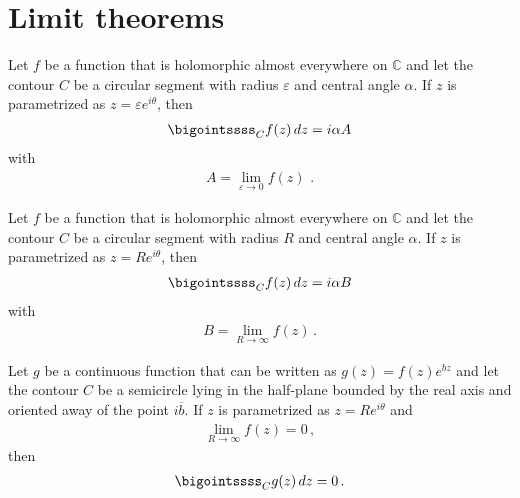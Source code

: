 \section{Limit theorems}

    \begin{theorem}\label{complex:small_limit}
        Let $f$ be a function that is holomorphic almost everywhere on $\mathbb{C}$ and let the contour $C$ be a circular segment with radius $\varepsilon$ and central angle $\alpha$. If $z$ is parametrized as $z=\varepsilon e^{i\theta}$, then
        \begin{gather}
            \bigointssss_Cf(z)\,dz = i\alpha A
        \end{gather}
        with
        \begin{gather}
            A = \lim_{\varepsilon\rightarrow0}f(z)\,\,.
        \end{gather}
    \end{theorem}

    \begin{theorem}\label{complex:great_limit}
        Let $f$ be a function that is holomorphic almost everywhere on $\mathbb{C}$ and let the contour $C$ be a circular segment with radius $R$ and central angle $\alpha$. If $z$ is parametrized as $z=Re^{i\theta}$, then
        \begin{gather}
            \bigointssss_Cf(z)\,dz = i\alpha B
        \end{gather}
        with
        \begin{gather}
            B = \lim_{R\rightarrow\infty}f(z)\,.
        \end{gather}
    \end{theorem}

    \begin{theorem}\label{complex:jordan}
        Let $g$ be a continuous function that can be written as $g(z) = f(z)e^{bz}$ and let the contour $C$ be a semicircle lying in the half-plane bounded by the real axis and oriented away of the point $i\overline{b}$. If $z$ is parametrized as $z=Re^{i\theta}$ and
        \begin{gather}
            \lim_{R\rightarrow\infty}f(z) = 0\,,
        \end{gather}
        then
        \begin{gather}
            \bigointssss_Cg(z)\,dz = 0\,.
        \end{gather}
    \end{theorem}